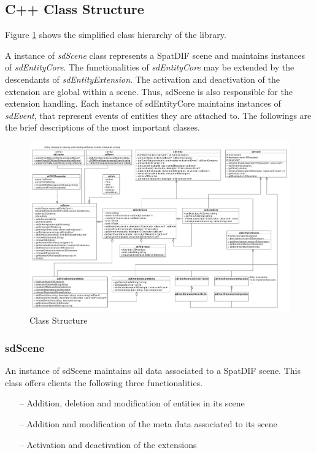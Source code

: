 \documentclass[a4paper]{article}
\begin{document}
\subsection{C++ Class Structure}

Figure \ref{fig:class_structure} shows the simplified class hierarchy of the library. 

A instance of {\it sdScene} class represents a SpatDIF scene and maintains instances of {\it sdEntityCore}. The functionalities of {\it sdEntityCore} may be extended by the descendants of {\it sdEntityExtension}. 
The activation and deactivation of the extension are global within a scene. 
Thus, sdScene is also responsible for the extension handling. 
Each instance of sdEntityCore maintains instances of {\it sdEvent}, that represent events of entities they are attached to. The followings are the brief descriptions of the most important classes.

\begin{figure}[t]
\centerline{
	\includegraphics[width= 17.5cm]{classes.pdf}}
\caption{Class Structure}
\label{fig:class_structure}
\end{figure}

\subsubsection{sdScene}
An instance of sdScene maintains all data associated to a SpatDIF scene. This class offers clients the following three functionalities.

\begin{itemize}[leftmargin=*]
\item[--] Addition, deletion and modification of entities in its scene
\item[--] Addition and modification of the meta data associated to its scene
\item[--] Activation and deactivation of the extensions
\end{itemize}
\end{document}
